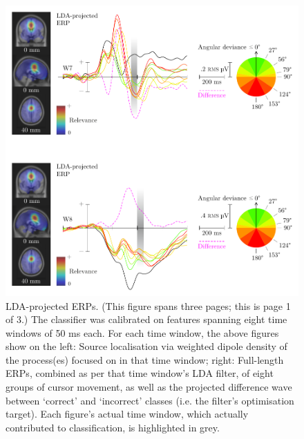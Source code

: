 \begin{figure}[p]
    \renewcommand\thefigure{\ref{chapter:nat}.S5.3}
    \centering
    \includegraphics[width=\textwidth]{figures/nat-app-fig-s5-3.pdf}
    \caption[LDA-projected ERPs. (This figure spans three pages; this is page 1 of 3.)]{LDA-projected ERPs. (This figure spans three pages; this is page 1 of 3.) The classifier was calibrated on features spanning eight time windows of 50 ms each. For each time window, the above figures show on the left: Source localisation via weighted dipole density of the process(es) focused on in that time window; right: Full-length ERPs, combined as per that time window's LDA filter, of eight groups of cursor movement, as well as the projected difference wave between `correct' and `incorrect' classes (i.e. the filter's optimisation target). Each figure's actual time window, which actually contributed to classification, is highlighted in grey.}
\end{figure}

